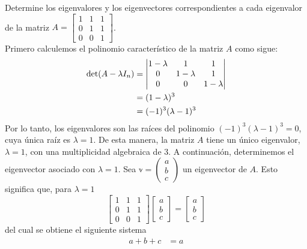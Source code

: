 \begin{example}
    Determine los eigenvalores y los eigenvectores correspondientes a cada eigenvalor de la matriz $A = \begin{bmatrix}
        1 & 1 & 1 \\
        0 & 1 & 1 \\
        0 & 0 & 1
    \end{bmatrix}$. \\
    \solucion Primero calculemos el polinomio característico de la matriz $A$ como sigue:
    \begin{align*}
        \operatorname{det}(A - \lambda I_n) & = \begin{vmatrix}
            1 - \lambda & 1 & 1 \\
            0 & 1 - \lambda & 1 \\
            0 & 0 & 1 - \lambda
        \end{vmatrix} \\
        & = (1 - \lambda)^3 \\
        & = (-1)^3 (\lambda - 1)^3
    \end{align*}\newpage\noindent
    Por lo tanto, los eigenvalores son las raíces del polinomio $(-1)^3 (\lambda - 1)^3 = 0$, cuya única raíz es $\lambda = 1$. De esta manera, la matriz $A$ tiene un único eigenvalor, $\lambda = 1$, con una multiplicidad algebraica de $3$. A continuación, determinemos el eigenvector asociado con $\lambda = 1$. Sea $\mathbb{v} = \begin{pmatrix} a \\ b \\ c \end{pmatrix}$ un eigenvector de $A$. Esto significa que, para $\lambda = 1$
    $$\begin{bmatrix}
        1 & 1 & 1 \\
        0 & 1 & 1 \\
        0 & 0 & 1
    \end{bmatrix} \begin{bmatrix}
        a \\
        b \\
        c
    \end{bmatrix} = \begin{bmatrix}
        a \\
        b \\
        c
    \end{bmatrix}$$
    del cual se obtiene el siguiente sistema
    \begin{align*}
        a + b + c & = a \\

\end{align*}
\end{example}
